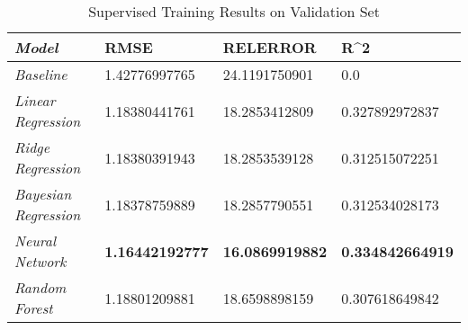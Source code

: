 \documentclass[letterpaper, 10 pt, conference]{ieeeconf}  %
\begin{document}
{\renewcommand{\arraystretch}{2}%
\begin{table*}[t]
\centering
\caption{Supervised Training Results on Validation Set}
{}\label{table:validation_set_results}
\begin{tabular}{|l|lll}
\hline
\textit{\textbf{Model}}      & \multicolumn{1}{l|}{\textbf{RMSE}} & \multicolumn{1}{l|}{\textbf{RELERROR}} & \multicolumn{1}{l|}{\textbf{R\textasciicircum 2}} \\ \hline
\textit{Baseline}            & 1.42776997765                      & 24.1191750901                          & 0.0                                               \\ \cline{1-1}
\textit{Linear Regression}   & 1.18380441761                      & 18.2853412809                          & 0.327892972837                                    \\ \cline{1-1}
\textit{Ridge Regression}    & 1.18380391943                      & 18.2853539128                          & 0.312515072251                                    \\ \cline{1-1}
\textit{Bayesian Regression} & 1.18378759889                      & 18.2857790551                          & 0.312534028173                                    \\ \cline{1-1}
\textit{Neural Network}      & \textbf{1.16442192777}             & \textbf{16.0869919882}                 & \textbf{0.334842664919}                           \\ \cline{1-1}
\textit{Random Forest}       & 1.18801209881                      & 18.6598898159                          & 0.307618649842                                    \\ \cline{1-1}
\end{tabular}
\end{table*}
}
\end{document}
